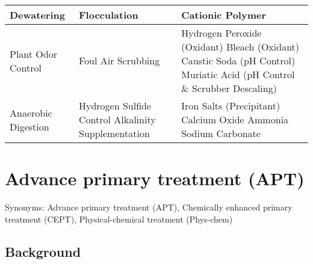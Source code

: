 \begin{tabular}{ |p{4cm}|p{4.5cm}|p{6.5cm}|  }
\hline
Dewatering & Flocculation & Cationic Polymer \\
\hline
Plant Odor Control & Foul Air Scrubbing & Hydrogen Peroxide (Oxidant) \newline Bleach (Oxidant) \newline Caustic Soda (pH Control) \newline Muriatic Acid (pH Control \& Scrubber Descaling)\\
\hline
Anaerobic Digestion & Hydrogen Sulfide Control \newline Alkalinity Supplementation & Iron Salts (Precipitant) \newline Calcium Oxide \newline Ammonia \newline Sodium Carbonate \\
\hline
\end{tabular}

\section{Advance primary treatment (APT)}
Synonyms:  Advance primary treatment (APT), Chemically enhanced primary treatment (CEPT), Physical-chemical treatment (Phys-chem)
\subsection{Background}     
      
